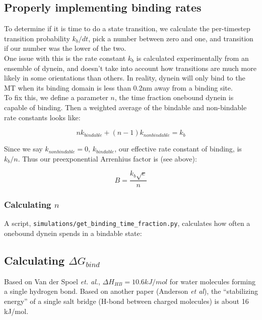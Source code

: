 \documentclass[10pt]{article} %
\begin{document}
\subsection{Properly implementing binding rates}
To determine if it is time to do a state transition, we calculate the per-timestep
transition probability $k_b/dt$, pick a number between zero and one, and transition
if our number was the lower of the two.\\

One issue with this is the rate constant $k_b$ is calculated experimentally from an
ensemble of dynein, and doesn't take into account how transitions are much more likely in some orientations than others. In reality, dynein will only bind to the MT when
its binding domain is less than 0.2nm away from a binding site.\\

To fix this, we define a parameter $n$, the time fraction onebound dynein is capable
of binding. Then a weighted average of the bindable and non-bindable rate constants
looks like:

\begin{equation*}
  nk_{bindable} + (n-1)k_{nonbindable} = k_b
\end{equation*}

Since we say $k_{nonbindable} = 0$, $k_{bindable}$, our effective rate constant of
binding, is $k_b/n$. Thus our preexponential Arrenhius factor is (see above):

\begin{equation*}
  B = \frac{k_{b}\sqrt{e}}{n}
\end{equation*}

\subsubsection{Calculating $n$}
A script, \verb|simulations/get_binding_time_fraction.py|, calculates how often
a onebound dynein spends in a bindable state:



\subsection{Calculating $\Delta G_{bind}$}
Based on Van der Spoel \textit{et. al.}, $\Delta H_{HB} = 10.6kJ/mol$ for water molecules forming a single hydrogen bond. Based on another paper (Anderson \textit{et al}), the
``stabilizing energy'' of a single salt bridge (H-bond between charged molecules) is about 16 kJ/mol.\\
\end{document}
